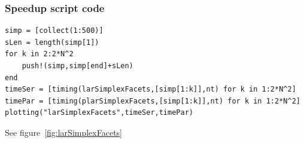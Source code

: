 \documentclass[a4paper,12pt,titlepage]{article}					%
\begin{document}
\subsubsection{Speedup script code}
\begin{Verbatim}
simp = [collect(1:500)]
sLen = length(simp[1])
for k in 2:2*N^2
	push!(simp,simp[end]+sLen)
end
timeSer = [timing(larSimplexFacets,[simp[1:k]],nt) for k in 1:2*N^2]
timePar = [timing(plarSimplexFacets,[simp[1:k]],nt) for k in 1:2*N^2]
plotting("larSimplexFacets",timeSer,timePar)
\end{Verbatim}

See figure~\ref{fig:larSimplexFacets}

\begin{figure}[h]
\centering
{} \quad
{} \\

\end{figure}
\end{document}
